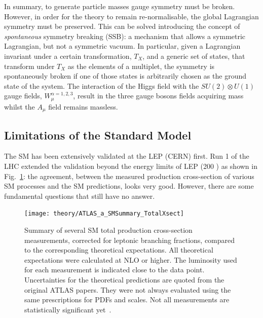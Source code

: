 			In summary, to generate particle masses gauge symmetry must be broken. However, in order for the theory to remain re-normalisable, the global Lagrangian symmetry must be preserved. This can be solved introducing the concept of \emph{spontaneous} symmetry breaking (SSB): a mechanism that allows a symmetric Lagrangian, but not a symmetric vacuum. In particular, given a Lagrangian invariant under a certain transformation, $T_X$, and a generic set of states, that transform under $T_X$ as the elements of a multiplet, the symmetry is spontaneously broken if one of those states is arbitrarily chosen as the ground state of the system. 
			The interaction of the Higgs field with the $SU(2) \otimes U(1)$ gauge fields, $W_\mu^{\alpha =1,2,3}$, result in the three gauge bosons fields acquiring mass whilst the $A_\mu$ field remains massless. 



		\subsection{Limitations of the Standard Model}
		\label{sec:SMlim}

			The \ac{SM} has been extensively validated at the \ac{LEP} (\ac{CERN}) first. Run 1 of the \ac{LHC} extended the validation beyond the energy limits of LEP (200 \GeV) as shown in Fig.~\ref{fig:ATLAS_a_SMSummary_TotalXsect}: the agreement, between the measured production cross-section of various \ac{SM} processes and the \ac{SM} predictions, looks very good. However, there are some fundamental questions that still have no answer.

			\begin{figure}[!htb]
				\centering
				\texttt{[image: theory/ATLAS\_a\_SMSummary\_TotalXsect]}
				\caption{\label{fig:ATLAS_a_SMSummary_TotalXsect} Summary of several \ac{SM} total production cross-section measurements, corrected for leptonic branching fractions, compared to the corresponding theoretical expectations. All theoretical expectations were calculated at NLO or higher. The luminosity used for each measurement is indicated close to the data point. Uncertainties for the theoretical predictions are quoted from the original ATLAS papers. They were not always evaluated using the same prescriptions for PDFs and scales. Not all measurements are statistically significant yet~\cite{ATLAS_a_SMSummary_TotalXsect}.}
			\end{figure}



